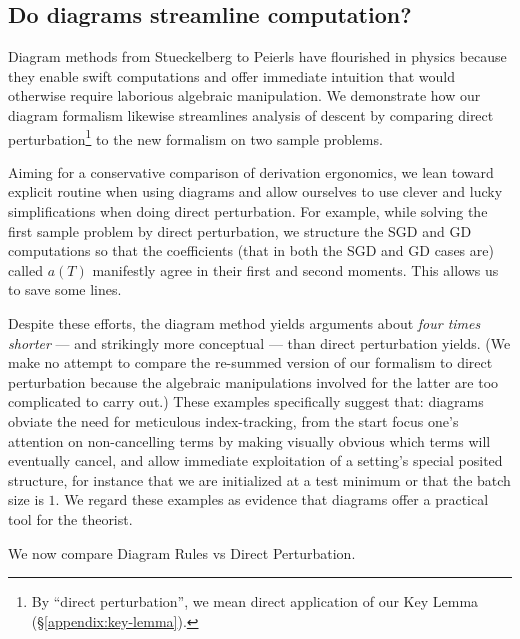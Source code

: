 \documentclass[anon,12pt]{colt2021} %
\newcommand{\translucent}[2]{\colorbox{#1}{#2}}
\begin{document}
{    \subsection{Do diagrams streamline computation?}                \label{appendix:diagrams-streamline}

        Diagram methods from Stueckelberg to Peierls have flourished in physics
        because they enable swift computations and offer immediate intuition
        that would otherwise require laborious algebraic manipulation.  We
        demonstrate how our diagram formalism likewise streamlines analysis of
        descent by comparing direct perturbation\footnote{
            By ``direct perturbation'', we mean direct application of our Key
            Lemma (\S\ref{appendix:key-lemma}).
        }
        to the new formalism on two sample problems.

        Aiming for a conservative comparison of derivation ergonomics, we lean
        toward explicit routine when using diagrams and allow ourselves to use
        clever and lucky simplifications when doing direct perturbation.  For
        example, while solving the first sample problem by direct perturbation,
        we structure the SGD and GD computations so that the coefficients (that
        in both the SGD and GD cases are) called $a(T)$ manifestly agree in
        their first and second moments.  This allows us to save some lines.

        Despite these efforts, the diagram method yields arguments about
        \emph{four times shorter} --- and strikingly more conceptual --- than
        direct perturbation yields.  
        (We make no attempt to compare the re-summed version of our formalism to
        direct perturbation because the algebraic manipulations involved for
        the latter are too complicated to carry out.) 
        These examples specifically suggest that:
        diagrams obviate the need for meticulous index-tracking, from the start
        focus one's attention on non-cancelling terms by making visually
        obvious which terms will eventually cancel, and allow immediate
        exploitation of a setting's special posited structure, for instance
        that we are initialized at a test minimum or that the batch size is
        $1$.  We regard these examples as evidence that diagrams offer a
        practical tool for the theorist.

        We now compare {\translucent{moolime}{Diagram Rules}} vs
        {\translucent{moosky}{Direct Perturbation}}.

}
\end{document}
